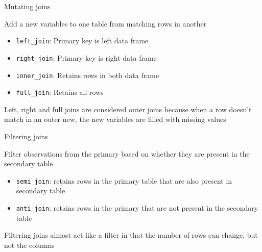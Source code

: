 \documentclass[ignorenonframetext,]{beamer}
\providecommand{\tightlist}{%
  \setlength{\itemsep}{0pt}\setlength{\parskip}{0pt}}
\begin{document}
\begin{frame}[fragile]{Mutating joins}

\begin{block}{Add a new variables to one table from matching rows in
another}

\begin{itemize}
\tightlist
\item
  \texttt{left\_join}: Primary key is left data frame
\item
  \texttt{right\_join}: Primary key is right data frame
\item
  \texttt{inner\_join}: Retains rows in both data frame
\item
  \texttt{full\_join}: Retains all rows
\end{itemize}

Left, right and full joins are considered outer joins because when a row
doesn't match in an outer new, the new variables are filled with missing
values

\end{block}

\end{frame}

\begin{frame}[fragile]{Filtering joins}

\begin{block}{Filter observations from the primary based on whether they
are present in the secondary table}

\begin{itemize}
\tightlist
\item
  \texttt{semi\_join}: retains rows in the primary table that are also
  present in secondary table
\item
  \texttt{anti\_join}: retains rows in the primary that are not present
  in the secondary table
\end{itemize}

Filtering joins almost act like a filter in that the number of rows can
change, but not the columns

\end{block}

\end{frame}
\end{document}
